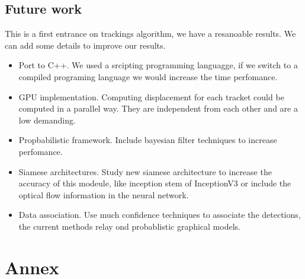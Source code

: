 \documentclass[12pt, a4paper, titlepage,twoside,openright]{article}
\begin{document}
\subsection{Future work}


This is a first entrance on trackings algorithm, we have a resanoable results. We can add some details to improve our results.


\begin{itemize}

\item Port to C++. We used a srcipting programming languagge, if we switch to a compiled programing language we would increase the time perfomance.

\item GPU implementation. Computing displacement for each tracket could be computed in a parallel way. They are independent from each other and are a low demanding. 

\item Propbabilistic framework. Include bayesian filter techniques to increase perfomance.

\item Siamese architectures. Study new siamese architecture to increase the accuracy of this modeule, like inception stem of InceptionV3 or include the optical flow information in the neural network.

\item Data association. Use much confidence techniques to associate the detections, the current methods relay ond probablistic graphical models.

\end{itemize}

{}



\section{Annex}
\end{document}
